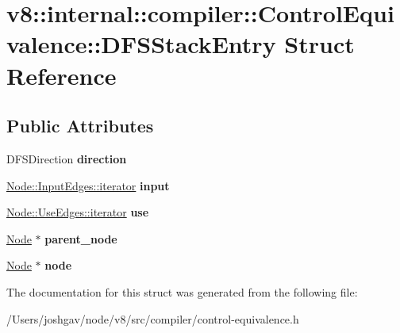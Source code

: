 \hypertarget{structv8_1_1internal_1_1compiler_1_1_control_equivalence_1_1_d_f_s_stack_entry}{}\section{v8\+:\+:internal\+:\+:compiler\+:\+:Control\+Equivalence\+:\+:D\+F\+S\+Stack\+Entry Struct Reference}
\label{structv8_1_1internal_1_1compiler_1_1_control_equivalence_1_1_d_f_s_stack_entry}
\subsection*{Public Attributes}
\begin{DoxyCompactItemize}
\item 
D\+F\+S\+Direction {\bfseries direction}\hypertarget{structv8_1_1internal_1_1compiler_1_1_control_equivalence_1_1_d_f_s_stack_entry_ace490d4499ad296ebf8dd36c7fbd7aee}{}\label{structv8_1_1internal_1_1compiler_1_1_control_equivalence_1_1_d_f_s_stack_entry_ace490d4499ad296ebf8dd36c7fbd7aee}

\item 
\hyperlink{classv8_1_1internal_1_1compiler_1_1_node_1_1_input_edges_1_1iterator}{Node\+::\+Input\+Edges\+::iterator} {\bfseries input}\hypertarget{structv8_1_1internal_1_1compiler_1_1_control_equivalence_1_1_d_f_s_stack_entry_a7bffb02fc1010f175b8ebe9afab46f54}{}\label{structv8_1_1internal_1_1compiler_1_1_control_equivalence_1_1_d_f_s_stack_entry_a7bffb02fc1010f175b8ebe9afab46f54}

\item 
\hyperlink{classv8_1_1internal_1_1compiler_1_1_node_1_1_use_edges_1_1iterator}{Node\+::\+Use\+Edges\+::iterator} {\bfseries use}\hypertarget{structv8_1_1internal_1_1compiler_1_1_control_equivalence_1_1_d_f_s_stack_entry_abb3e7150b52587d762222a7d242fa09b}{}\label{structv8_1_1internal_1_1compiler_1_1_control_equivalence_1_1_d_f_s_stack_entry_abb3e7150b52587d762222a7d242fa09b}

\item 
\hyperlink{classv8_1_1internal_1_1compiler_1_1_node}{Node} $\ast$ {\bfseries parent\+\_\+node}\hypertarget{structv8_1_1internal_1_1compiler_1_1_control_equivalence_1_1_d_f_s_stack_entry_a618d452f4efedc5939199b92a0bb5c64}{}\label{structv8_1_1internal_1_1compiler_1_1_control_equivalence_1_1_d_f_s_stack_entry_a618d452f4efedc5939199b92a0bb5c64}

\item 
\hyperlink{classv8_1_1internal_1_1compiler_1_1_node}{Node} $\ast$ {\bfseries node}\hypertarget{structv8_1_1internal_1_1compiler_1_1_control_equivalence_1_1_d_f_s_stack_entry_a60b15f6f151ca28fbfb21f47b254d752}{}\label{structv8_1_1internal_1_1compiler_1_1_control_equivalence_1_1_d_f_s_stack_entry_a60b15f6f151ca28fbfb21f47b254d752}

\end{DoxyCompactItemize}


The documentation for this struct was generated from the following file\+:\begin{DoxyCompactItemize}
\item 
/\+Users/joshgav/node/v8/src/compiler/control-\/equivalence.\+h\end{DoxyCompactItemize}

